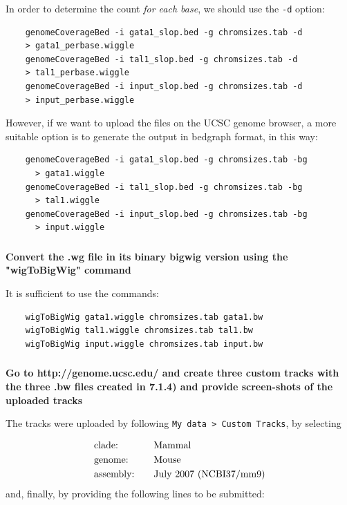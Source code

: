\documentclass[12pt, a4paper]{article}
\begin{document}
	In order to determine the count \textit{for each base}, we should use the \verb|-d| option:
	
	\begin{verbatim}
	genomeCoverageBed -i gata1_slop.bed -g chromsizes.tab -d
	> gata1_perbase.wiggle
	genomeCoverageBed -i tal1_slop.bed -g chromsizes.tab -d
	> tal1_perbase.wiggle
	genomeCoverageBed -i input_slop.bed -g chromsizes.tab -d
	> input_perbase.wiggle
	\end{verbatim}
	
	However, if we want to upload the files on the UCSC genome browser, a more suitable option is to generate the output in bedgraph format, in this way:
	
	\begin{verbatim}
	genomeCoverageBed -i gata1_slop.bed -g chromsizes.tab -bg
	  > gata1.wiggle
	genomeCoverageBed -i tal1_slop.bed -g chromsizes.tab -bg
	  > tal1.wiggle
	genomeCoverageBed -i input_slop.bed -g chromsizes.tab -bg
	  > input.wiggle
	\end{verbatim}
	
	\subsubsection{}
	\textbf{Convert the .wg file in its binary bigwig version using the "wigToBigWig" command}
	
	It is sufficient to use the commands:
	
	\begin{verbatim}
	wigToBigWig gata1.wiggle chromsizes.tab gata1.bw
	wigToBigWig tal1.wiggle chromsizes.tab tal1.bw
	wigToBigWig input.wiggle chromsizes.tab input.bw
	\end{verbatim}
	
	\subsubsection{}
	\textbf{Go to http://genome.ucsc.edu/ and create three custom tracks with the three .bw files created in 7.1.4) and provide screen-shots of the uploaded tracks}
	
	The tracks were uploaded by following \verb|My data > Custom Tracks|, by selecting
	
	\begin{alignat*}{2}
	& \text{clade:} && \text{Mammal}\\
	& \text{genome:} && \text{Mouse}\\
	& \text{assembly:\quad} && \text{July 2007 (NCBI37/mm9)}\\
	\end{alignat*}
	and, finally, by providing the following lines to be submitted:
	
\end{document}
